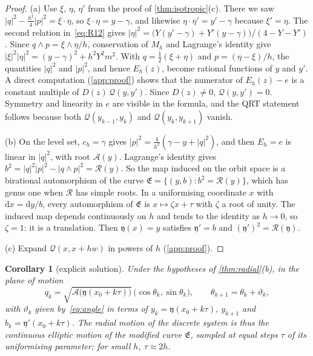 \documentclass[11pt,a4paper]{article}
\newtheorem{corollary}[theorem]{Corollary}
\theoremstyle{definition}
\theoremstyle{remark}
\newcommand{\dd}{\mathrm{d}}
\begin{document}
\begin{proof}
(a) Use $\xi$, $\eta$, $\eta'$ from the proof of \cref{thm:isotropic}(c). There we saw
$\lvert q\rvert^2-\frac{h^2}{4}\lvert p\rvert^2=\xi\cdot\eta$, so $\xi\cdot\eta=y-\gamma$, and likewise
$\eta\cdot\eta'=y'-\gamma$ because $\xi'=\eta$. The second relation in~\eqref{eq:R12} gives
$\lvert\eta\rvert^2=\big(Y(y'-\gamma)+Y'(y-\gamma)\big)/(4-Y-Y')$. Since $q\wedge p=\xi\wedge\eta/h$, conservation
of $M_h$ and Lagrange's identity give $\lvert\xi\rvert^2\lvert\eta\rvert^2=(y-\gamma)^2+h^2Y^2m^2$. With
$q=\frac12(\xi+\eta)$ and $p=(\eta-\xi)/h$, the quantities $\lvert q\rvert^2$ and $\lvert p\rvert^2$, and hence
$E_h(z)$, become rational functions of $y$ and $y'$. A direct computation (\cref{app:proof}) shows that the
numerator of $E_h(z)-e$ is a constant multiple of $D(z)\,\mathcal Q(y,y')$. Since $D(z)\ne0$, $\mathcal
Q(y,y')=0$. Symmetry and linearity in $e$ are visible in the formula, and the QRT statement follows because both
$\mathcal Q(y_{k-1},y_k)$ and $\mathcal Q(y_k,y_{k+1})$ vanish.

(b) On the level set, $c_h=\gamma$ gives $\lvert p\rvert^2=\frac4{h^2}(\gamma-y+\lvert q\rvert^2)$, and then
$E_h=e$ is linear in $\lvert q\rvert^2$, with root $\mathcal A(y)$. Lagrange's identity gives
$b^2=\lvert q\rvert^2\lvert p\rvert^2-\lvert q\wedge p\rvert^2=\mathcal R(y)$. So the map induced on the orbit space
is a birational automorphism of the curve $\mathfrak E=\{(y,b):b^2=\mathcal R(y)\}$, which has genus one when $\mathcal R$ has
simple roots. In a uniformising coordinate $x$ with $\dd x=\dd y/b$, every automorphism of $\mathfrak E$ is
$x\mapsto\zeta x+\tau$ with $\zeta$ a root of unity. The induced map depends continuously on $h$ and tends to the
identity as $h\to0$, so $\zeta=1$: it is a translation. Then $\mathfrak y(x)=y$ satisfies $\mathfrak y'=b$ and
$(\mathfrak y')^2=\mathcal R(\mathfrak y)$.

(c) Expand $\mathcal Q(x,x+hw)$ in powers of $h$ (\cref{app:proof}).
\end{proof}

\begin{corollary}[explicit solution]\label{cor:explicit-solution}
Under the hypotheses of \cref{thm:radial}(b), in the plane of motion
\[
q_k=\sqrt{\mathcal A\big(\mathfrak y(x_0+k\tau)\big)}\,\big(\cos\theta_k,\sin\theta_k\big),\qquad
\theta_{k+1}=\theta_k+\vartheta_k,
\]
with $\vartheta_k$ given by~\eqref{eq:angle} in terms of $y_k=\mathfrak y(x_0+k\tau)$, $y_{k+1}$ and
$b_k=\mathfrak y'(x_0+k\tau)$. The radial motion of the discrete system is thus the continuous elliptic motion of the
modified curve $\mathfrak E$, sampled at equal steps $\tau$ of its uniformising parameter; for small $h$,
$\tau\approx2h$.
\end{corollary}
\end{document}
